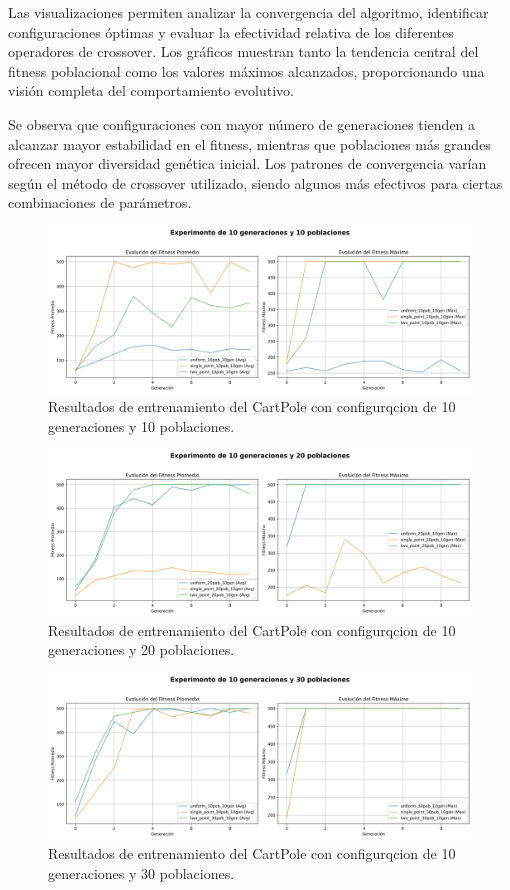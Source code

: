 \documentclass[12pt,a4paper]{article}
\begin{document}
Las visualizaciones permiten analizar la convergencia del algoritmo, identificar configuraciones óptimas y evaluar la efectividad relativa de los diferentes operadores de crossover. Los gráficos muestran tanto la tendencia central del fitness poblacional como los valores máximos alcanzados, proporcionando una visión completa del comportamiento evolutivo.

Se observa que configuraciones con mayor número de generaciones tienden a alcanzar mayor estabilidad en el fitness, mientras que poblaciones más grandes ofrecen mayor diversidad genética inicial. Los patrones de convergencia varían según el método de crossover utilizado, siendo algunos más efectivos para ciertas combinaciones de parámetros.

\begin{figure}[H]
  \centering
  \includegraphics[width=1\textwidth]{img/10-gen-10-pob-results.png}
  \caption{Resultados de entrenamiento del CartPole con configurqcion de 10 generaciones y 10 poblaciones.}
\end{figure}

\begin{figure}[H]
  \centering
  \includegraphics[width=1\textwidth]{img/10-gen-20-pob-results.png}
  \caption{Resultados de entrenamiento del CartPole con configurqcion de 10 generaciones y 20 poblaciones.}
\end{figure}

\begin{figure}[H]
  \centering
  \includegraphics[width=1\textwidth]{img/10-gen-30-pob-results.png}
  \caption{Resultados de entrenamiento del CartPole con configurqcion de 10 generaciones y 30 poblaciones.}
\end{figure}
\end{document}
